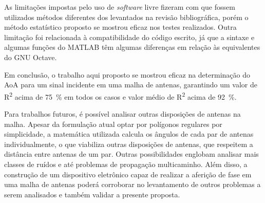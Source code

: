 As limitações impostas pelo uso de \textit{software} livre fizeram com que fossem utilizados métodos diferentes dos levantados na revisão bibliográfica, porém o método estatístico proposto se mostrou eficaz nos testes realizados.
Outra limitação foi relacionada à compatibilidade do código escrito, já que a sintaxe e algumas funções do MATLAB têm algumas diferenças em relação às equivalentes do GNU Octave.

Em conclusão, o trabalho aqui proposto se mostrou eficaz na determinação do \ac{AoA} para um sinal incidente em uma malha de antenas, garantindo um valor de R\textsuperscript{2} acima de \qty{75}{\percent} em todos os casos e valor médio de R\textsuperscript{2} acima de \qty{92}{\percent}.

Para trabalhos futuros, é possível analisar outras disposições de antenas na malha.
Apesar da formulação atual optar por polígonos regulares por simplicidade, a matemática utilizada calcula os ângulos de cada par de antenas individualmente, o que viabiliza outras disposições de antenas, que respeitem a distância entre antenas de um par.
Outras possibilidades englobam analisar mais classes de ruídos e até problemas de propagação multicaminho.
Além disso, a construção de um dispositivo eletrônico capaz de realizar a aferição de fase em uma malha de antenas poderá corroborar no levantamento de outros problemas a serem analisados e também validar a presente proposta.

